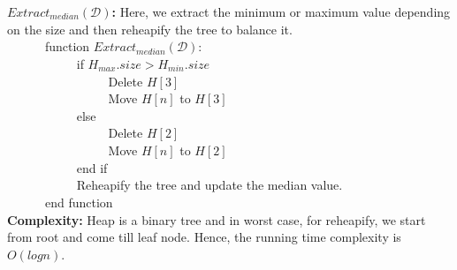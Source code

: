 \documentclass[12pt]{article}
\begin{document}
\begin{enumerate}
\begin{itemize}
\textbf{$Extract_{median}(\mathcal{D})$:} Here, we extract the minimum or maximum value depending on the size and then reheapify the tree to balance it.\\
\verb|		|function $Extract_{median}(\mathcal{D})$:\\
\verb|		|\verb|		|if $H_{max}.size > H_{min}.size$\\
\verb|		|\verb|		|\verb|		|Delete $H[3]$\\
\verb|		|\verb|		|\verb|		|Move $H[n]$ to $H[3]$\\
\verb|		|\verb|		|else\\
\verb|		|\verb|		|\verb|		|Delete $H[2]$\\
\verb|		|\verb|		|\verb|		|Move $H[n]$ to $H[2]$\\
\verb|		|\verb|		|end if\\
\verb|		|\verb|		|Reheapify the tree and update the median value.\\
\verb|		|end function\\
\textbf{Complexity:} Heap is a binary tree and in worst case, for reheapify, we start from root and come till leaf node. Hence, the running time complexity is $O(logn)$.\\

\end{itemize}
\end{enumerate}
\pagebreak
\end{document}
